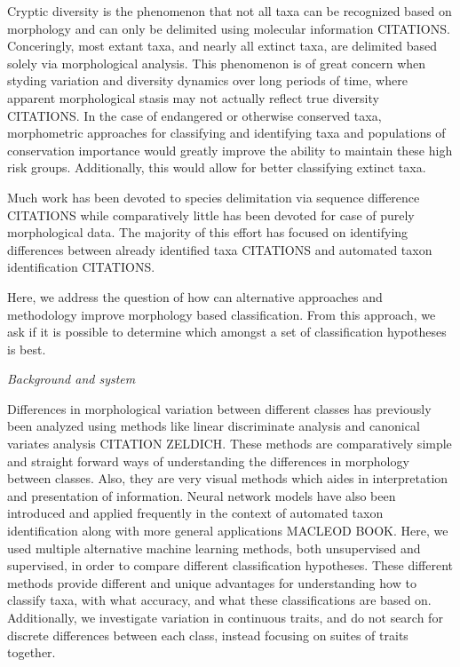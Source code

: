 \documentclass[12pt,letterpaper]{article}\usepackage{graphicx, color}
\renewcommand{\subsection}[1]{%
\bigskip
\begin{center}
\begin{large}
\normalfont\itshape #1
\end{large}
\end{center}}
\begin{document}
Cryptic diversity is the phenomenon that not all taxa can be recognized based on morphology and can only be delimited using molecular information CITATIONS. Conceringly, most extant taxa, and nearly all extinct taxa, are delimited based solely via morphological analysis. This phenomenon is of great concern when styding variation and diversity dynamics over long periods of time, where apparent morphological stasis may not actually reflect true diversity CITATIONS. In the case of endangered or otherwise conserved taxa, morphometric approaches for classifying and identifying taxa and populations of conservation importance would greatly improve the ability to maintain these high risk groups. Additionally, this would allow for better classifying extinct taxa.

Much work has been devoted to species delimitation via sequence difference CITATIONS while comparatively little has been devoted for case of purely morphological data. The majority of this effort has focused on identifying differences between already identified taxa CITATIONS and automated taxon identification CITATIONS.

Here, we address the question of how can alternative approaches and methodology improve morphology based classification. From this approach, we ask if it is possible to determine which amongst a set of classification hypotheses is best.

\subsection{Background and system}
Differences in morphological variation between different classes has previously been analyzed using methods like linear discriminate analysis and canonical variates analysis CITATION ZELDICH. These methods are comparatively simple and straight forward ways of understanding the differences in morphology between classes. Also, they are very visual methods which aides in interpretation and presentation of information. Neural network models have also been introduced and applied frequently in the context of automated taxon identification along with more general applications MACLEOD BOOK. Here, we used multiple alternative machine learning methods, both unsupervised and supervised, in order to compare different classification hypotheses. These different methods provide different and unique advantages for understanding how to classify taxa, with what accuracy, and what these classifications are based on. Additionally, we investigate variation in continuous traits, and do not search for discrete differences between each class, instead focusing on suites of traits together.
\end{document}
